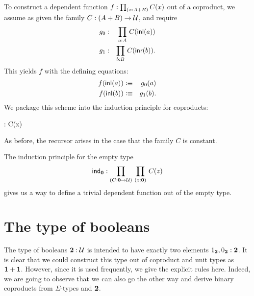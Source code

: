 To construct a dependent function $f:\prd{x:A+B}C(x)$ out of a coproduct, we assume as given the family 
$C: (A + B) \to \mathcal{U}$, and 
require 
\begin{eqnarray*}
  g_0 & : & \prd{a:A} C(\inl(a)) \\
  g_1 & : & \prd{b:B} C(\inr(b)).
\end{eqnarray*}
This yields $f$ with the defining equations:
\begin{eqnarray*}
  f({\mathsf{inl}}(a)) & \vcentcolon\equiv & g_0(a) \\
  f({\mathsf{inl}}(b)) & \vcentcolon\equiv & g_1(b) .
\end{eqnarray*}
We package this scheme into the induction principle for coproducts:
%
\begin{narrowmultline*}
   :
   \to \narrowbreak
   \to {}C(x) 
\end{narrowmultline*}
As before, the recursor arises in the case that the family $C$ is
constant. 

The induction principle for the empty type
%
\[ \ind{\emptyt} : \prd{C:\emptyt \to \UU}{z:\emptyt} C(z) \]
gives us a way to define a trivial dependent function out of the
empty type. %

%
%


\section{The type of booleans}
\label{sec:type-booleans}

%
%
The type of booleans $\mathbf{2}:\mathcal{U}$ is intended to have exactly two elements 
${1_{\mathbf{2}}},{0_{\mathbf{2}}} : \mathbf{2}$. It is clear that we could construct this
type out of coproduct
%
and unit types as $\mathbf{1} + \mathbf{1}$. However,
since it is used frequently, we give the explicit rules here.
Indeed, we are going to observe that we can also go the other way
and derive binary coproducts from $\Sigma$-types and $\mathbf{2}$.

